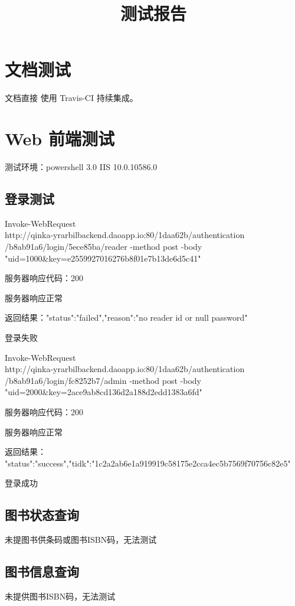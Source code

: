 \documentclass[UTF8]{report}
\title{测试报告}
\begin{document}
    \maketitle
    
    \tableofcontents
    \chapter{文档测试}
    文档直接 使用 Travis-CI 持续集成。
    \chapter{Web 前端测试}
    测试环境：powershell 3.0 IIS 10.0.10586.0
    \section{登录测试}
    Invoke-WebRequest \\
    http://qinka-yrarbilbackend.daoapp.io:80/1daa62b/authentication \\
    /b8ab91a6/login/5ece85ba/reader -method post -body \\ "uid=1000\&key=e2559927016276b8f01e7b13de6d5c41"
    \par 服务器响应代码：200
    \par 服务器响应正常
    \par 返回结果：{"status":"failed","reason":"no reader id or null password"}
    \par  登录失败
    
    Invoke-WebRequest \\ http://qinka-yrarbilbackend.daoapp.io:80/1daa62b/authentication \\
    /b8ab91a6/login/fc8252b7/admin -method post -body \\
    "uid=2000\&key=2ace9ab8cd136d2a188d2edd1383a6fd"
    \par 服务器响应代码：200
    \par 服务器响应正常
    \par 返回结果：
    {"status":"success","tidk":"1c2a2ab6e1a919919c58175e2cca4ec5b7569f70756c82e5"}
    \par 登录成功
    
    \section{图书状态查询}
    未提图书供条码或图书ISBN码，无法测试
    
    \section{图书信息查询}
    未提供图书ISBN码，无法测试
    
\end{document}
